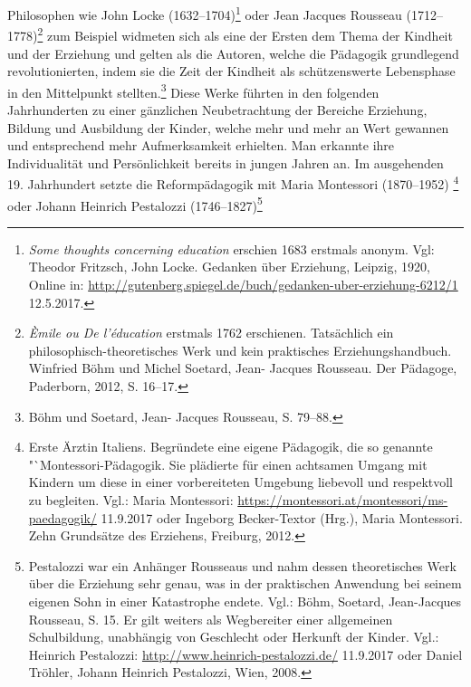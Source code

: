 \documentclass[
    a4paper,
    12pt,
    hyphens,
    chapterprefix=true,
    headheight=33pt,
    footheight=29pt,
    headings=optiontohead, %
]{scrartcl}
\begin{document}
{Philosophen wie John Locke (1632--1704)\footnote{\textit{Some thoughts concerning education} erschien 1683 erstmals anonym. Vgl: Theodor
Fritzsch, John Locke. Gedanken über Erziehung, Leipzig, 1920, Online in: \url{http://gutenberg.spiegel.de/buch/gedanken-uber-erziehung-6212/1}
12.5.2017.} oder Jean Jacques Rousseau (1712--1778)\footnote{\textit{Èmile ou De l'éducation} erstmals 1762 erschienen. Tatsächlich ein philosophisch-theoretisches Werk und kein praktisches Erziehungshandbuch. Winfried Böhm und Michel Soetard, Jean-
Jacques Rousseau. Der Pädagoge, Paderborn, 2012, S. 16--17.} zum Beispiel widmeten
sich als eine der Ersten dem Thema der Kindheit und der Erziehung und gelten als die Autoren, welche die Pädagogik grundlegend revolutionierten,
indem sie die Zeit der Kindheit als schützenswerte Lebensphase in den Mittelpunkt stellten.\footnote{Böhm und Soetard, Jean-
Jacques Rousseau, S. 79--88.} Diese Werke führten in den folgenden Jahrhunderten zu einer gänzlichen Neubetrachtung der
Bereiche Erziehung, Bildung und Ausbildung der Kinder, welche mehr und mehr an Wert gewannen und entsprechend mehr Aufmerksamkeit erhielten. Man
erkannte ihre Individualität und Persönlichkeit bereits in jungen Jahren an. Im ausgehenden 19. Jahrhundert setzte die Reformpädagogik mit Maria
Montessori (1870--1952)
\footnote{Erste Ärztin Italiens. Begründete eine eigene Pädagogik, die so genannte "`Montessori-Pädagogik. Sie plädierte
für einen achtsamen Umgang mit Kindern um diese in einer vorbereiteten Umgebung liebevoll und respektvoll zu begleiten. Vgl.: Maria Montessori:
\url{https://montessori.at/montessori/ms-paedagogik/} 11.9.2017 oder Ingeborg Becker-Textor (Hrg.), Maria Montessori. Zehn Grundsätze des
Erziehens, Freiburg, 2012.}
oder Johann Heinrich Pestalozzi (1746--1827)\footnote{Pestalozzi war ein Anhänger Rousseaus und nahm dessen
theoretisches Werk über die Erziehung sehr genau, was in der praktischen Anwendung bei seinem eigenen Sohn in einer Katastrophe endete. Vgl.:
Böhm, Soetard, Jean-Jacques Rousseau, S. 15. Er gilt weiters als Wegbereiter einer allgemeinen Schulbildung, unabhängig von Geschlecht oder
Herkunft der Kinder. Vgl.: Heinrich Pestalozzi: \url{http://www.heinrich-pestalozzi.de/} 11.9.2017 oder Daniel Tröhler, Johann Heinrich
Pestalozzi, Wien, 2008.}
}
\end{document}
